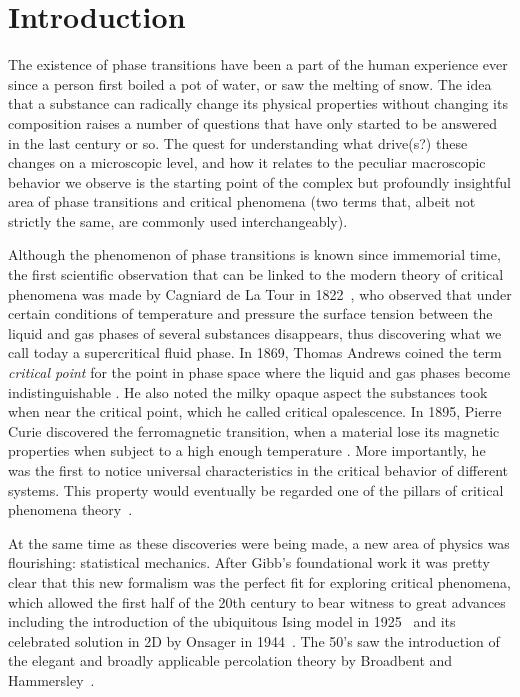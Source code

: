 \chapter{Introduction}
\label{ch:intr}


The existence of phase transitions have been a part of the human experience ever
since a person first boiled a pot of water, or saw the melting of snow. The
idea that a substance can radically change its physical properties without
changing its composition raises a number of questions that have only started to
be answered in the last century or so. The quest for understanding what
drive(s?) these changes on a microscopic level, and how it relates to the
peculiar macroscopic behavior we observe is the starting point of the complex
but profoundly insightful area of phase transitions and critical phenomena (two
terms that, albeit not strictly the same, are commonly used interchangeably).

Although the phenomenon of phase transitions is known since immemorial time,
the first scientific observation that can be linked to the modern theory of
critical phenomena was made by Cagniard de La Tour in 1822~\cite{delaTour1822},
who observed that under certain conditions of temperature and pressure the
surface tension between the liquid and gas phases of several substances
disappears, thus discovering what we call today a supercritical fluid phase. In
1869, Thomas Andrews coined the term \textit{critical point} for the point in
phase space where the liquid and gas phases become indistinguishable
\cite{Andrews1869}. He also noted the milky opaque aspect the substances took
when near the critical point, which he called critical opalescence.
In 1895, Pierre Curie discovered the ferromagnetic transition, when a material
lose its magnetic properties when subject to a high enough temperature
\cite{Curie1895}. More importantly, he was the first to notice universal
characteristics in the critical behavior of different systems. This property
would eventually be regarded one of the pillars of critical phenomena
theory~\cite{Stanley1999}.

At the same time as these discoveries were being made, a new area of physics
was flourishing: statistical mechanics. After Gibb's foundational work
\cite{Gibbs1906} it was pretty clear that this new formalism was the perfect
fit for exploring critical phenomena, which allowed the first half of the 20th
century to bear witness to great advances including the introduction of the
ubiquitous Ising model in 1925~\cite{Ising1925} and its celebrated solution in
2D by Onsager in 1944~\cite{Onsager1944}. The 50's saw the introduction of the
elegant and broadly applicable percolation theory by Broadbent and
Hammersley~\cite{Broadbent1957}.

